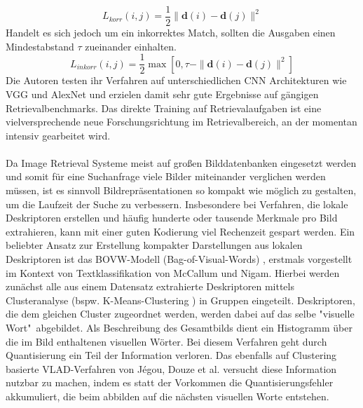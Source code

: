 \begin{equation}
L_{korr}(i,j) = \dfrac{1}{2} \parallel \mathbf{d}(i) - \mathbf{d}(j)\parallel^{2} 
\end{equation}
Handelt es sich jedoch um ein inkorrektes Match, sollten die Ausgaben einen Mindestabstand $\tau$ zueinander einhalten.
\begin{equation}
L_{inkorr}(i,j) = \dfrac{1}{2} \max\left[0, \tau - \parallel \mathbf{d}(i) - \mathbf{d}(j)\parallel^{2}\right] 
\end{equation}
Die Autoren testen ihr Verfahren auf unterschiedlichen CNN Architekturen wie VGG \cite{vgg} und AlexNet \cite{alexnet} und erzielen damit sehr gute Ergebnisse auf gängigen Retrievalbenchmarks. Das direkte Training auf Retrievalaufgaben ist eine vielversprechende neue Forschungsrichtung im Retrievalbereich, an der momentan intensiv gearbeitet wird.
\\\\
Da Image Retrieval Systeme meist auf großen Bilddatenbanken eingesetzt werden und somit für eine Suchanfrage viele Bilder miteinander verglichen werden müssen, ist es sinnvoll Bildrepräsentationen so kompakt wie möglich zu gestalten, um die Laufzeit der Suche zu verbessern. Insbesondere bei Verfahren, die lokale Deskriptoren erstellen und häufig hunderte oder tausende Merkmale pro Bild extrahieren, kann mit einer guten Kodierung viel Rechenzeit gespart werden. Ein beliebter Ansatz zur Erstellung kompakter Darstellungen aus lokalen Deskriptoren ist das BOVW-Modell (Bag-of-Visual-Words) \cite{bow}, erstmals vorgestellt im Kontext von Textklassifikation von McCallum und Nigam. Hierbei werden zunächst alle aus einem Datensatz extrahierte Deskriptoren mittels Clusteranalyse (bspw. K-Means-Clustering \cite{k_means}) in Gruppen eingeteilt. Deskriptoren, die dem gleichen Cluster zugeordnet werden, werden dabei auf das selbe "visuelle Wort"\ abgebildet. Als Beschreibung des Gesamtbilds dient ein Histogramm über die im Bild enthaltenen visuellen Wörter. Bei diesem Verfahren geht durch Quantisierung ein Teil der Information verloren. Das ebenfalls auf Clustering basierte VLAD-Verfahren \cite{vlad} von Jégou, Douze et al. versucht diese Information nutzbar zu machen, indem es statt der Vorkommen die Quantisierungsfehler akkumuliert, die beim abbilden auf die nächsten visuellen Worte entstehen. \\

